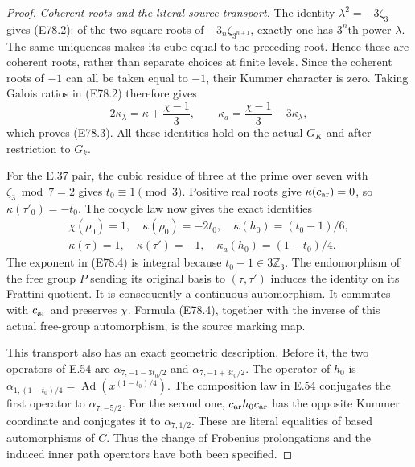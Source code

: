 \begin{proof}
\emph{Coherent roots and the literal source transport.}
The identity $\lambda^2=-3\zeta_3$ gives (E78.2):
of the two square roots of
$-3_n\zeta_{3^{n+1}}$, exactly one has $3^n$th
power $\lambda$. The same uniqueness makes its
cube equal to the preceding root. Hence these are
coherent roots, rather than separate choices at
finite levels. Since the coherent roots of $-1$
can all be taken equal to $-1$, their Kummer
character is zero. Taking Galois ratios in (E78.2)
therefore gives
\[
 2\kappa_\lambda=\kappa+\frac{\chi-1}{3},
 \qquad
 \kappa_a=\frac{\chi-1}{3}-3\kappa_\lambda,
 \tag{E78.20}
\]
which proves (E78.3).
All these identities hold on the actual $G_K$
and after restriction to $G_k$.

For the E.37 pair, the cubic residue of three
at the prime over seven with $\zeta_3\bmod7=2$
gives $t_0\equiv1\pmod3$. Positive real roots
give $\kappa(c_{\rm ar})=0$, so
$\kappa(\tau'_0)=-t_0$.
The cocycle law now gives the exact identities
\[
 \begin{gathered}
 \chi(\rho_0)=1,\quad\kappa(\rho_0)=-2t_0,\quad
 \kappa(h_0)=(t_0-1)/6,\\
 \kappa(\tau)=1,\quad\kappa(\tau')=-1,\quad
 \kappa_a(h_0)=(1-t_0)/4.
 \end{gathered}
 \tag{E78.21}
\]
The exponent in (E78.4) is integral because
$t_0-1\in3\mathbb Z_3$. The endomorphism of the
free group $P$ sending its original basis to
$(\tau,\tau')$ induces the identity on its
Frattini quotient. It is consequently a continuous
automorphism. It commutes with $c_{\rm ar}$ and
preserves $\chi$. Formula (E78.4), together with
the inverse of this actual free-group
automorphism, is the source marking map.

This transport also has an exact geometric
description. Before it, the two operators of
E.54 are
$\alpha_{7,-1-3t_0/2}$ and
$\alpha_{7,-1+3t_0/2}$.
The operator of $h_0$ is
$\alpha_{1,(1-t_0)/4}
 =\operatorname{Ad}(x^{(1-t_0)/4})$.
The composition law in E.54 conjugates the first
operator to $\alpha_{7,-5/2}$.
For the second one, $c_{\rm ar}h_0c_{\rm ar}$
has the opposite Kummer coordinate and conjugates
it to $\alpha_{7,1/2}$. These are literal
equalities of based automorphisms of $C$.
Thus the change of Frobenius prolongations and
the induced inner path operators have both been
specified.


\end{proof}
